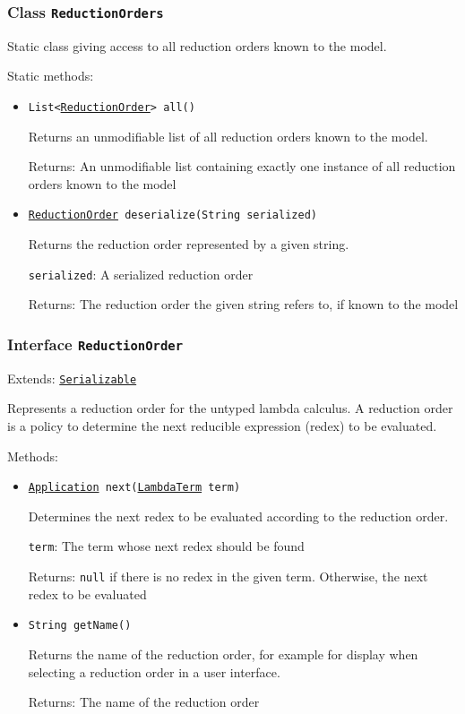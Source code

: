 \subsubsection{Class \texttt{ReductionOrders}}
\label{type:edu.kit.wavelength.client.model.reduction.ReductionOrders}
Static class giving access to all reduction orders known to the model.

Static methods:
\begin{itemize}
\item \texttt{List<\hyperref[type:edu.kit.wavelength.client.model.reduction.ReductionOrder]{ReductionOrder}> all()}

Returns an unmodifiable list of all reduction orders known to the model.

Returns: An unmodifiable list containing exactly one instance of all
 reduction orders known to the model

\item \texttt{\hyperref[type:edu.kit.wavelength.client.model.reduction.ReductionOrder]{ReductionOrder} deserialize(String serialized)}

Returns the reduction order represented by a given string.

\texttt{serialized}: A serialized reduction order

Returns: The reduction order the given string refers to, if known to the model

\end{itemize}

\subsubsection{Interface \texttt{ReductionOrder}}
\label{type:edu.kit.wavelength.client.model.reduction.ReductionOrder}
Extends: \texttt{\hyperref[type:edu.kit.wavelength.client.model.serialization.Serializable]{Serializable}}

Represents a reduction order for the untyped lambda calculus. A reduction
 order is a policy to determine the next reducible expression (redex) to be evaluated.

Methods:
\begin{itemize}
\item \texttt{\hyperref[type:edu.kit.wavelength.client.model.term.Application]{Application} next(\hyperref[type:edu.kit.wavelength.client.model.term.LambdaTerm]{LambdaTerm} term)}

Determines the next redex to be evaluated according to the reduction order.

\texttt{term}: The term whose next redex should be found

Returns: \texttt{null} if there is no redex in the given term. Otherwise,
 the next redex to be evaluated

\item \texttt{String getName()}

Returns the name of the reduction order, for example for display when
 selecting a reduction order in a user interface.

Returns: The name of the reduction order

\end{itemize}

